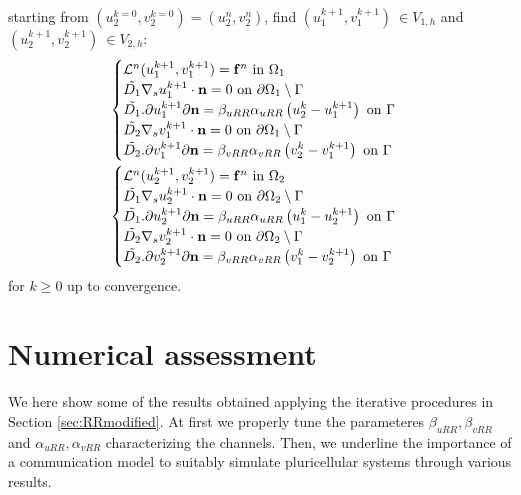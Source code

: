 starting from $(u_2^{k = 0}, v_2^{k = 0}) = (u_2^n, v_2^n)$, find $(u_1^{k+1}, v_1^{k+1}) \ \in V_{1,h}$ and $(u_2^{k+1}, v_2^{k+1}) \ \in V_{2,h}$:
\begin{equation}\label{eq::RRmodP}
\begin{aligned}
& \begin{cases}
\mathcal{L}^n (u_1^{k+1}, v_1^{k+1}) = \mathbf{f}^n \ \text{in} \ \Omega_1 \\
\Tilde{D_1} \nabla_s u_1^{k+1} \cdot \mathbf{n} = 0 \ \text{on} \ \partial \Omega_1 \setminus \Gamma \\
\Tilde{D_1} \displaystyle.{\partial u_1^{k+1}}{\partial \mathbf{n}} = \beta_{uRR} \alpha_{uRR} \left( u_2^{k} - u_1^{k+1} \right) \ \text{on} \ \Gamma \\
\Tilde{D_2} \nabla_s v_1^{k+1} \cdot \mathbf{n} = 0 \ \text{on} \ \partial \Omega_1 \setminus \Gamma \\
\Tilde{D_2} \displaystyle.{\partial v_1^{k+1}}{\partial \mathbf{n}} = \beta_{vRR} \alpha_{vRR} \left( v_2^{k} - v_1^{k+1} \right) \ \text{on} \ \Gamma
\end{cases}
\\
& \begin{cases}
\mathcal{L}^n (u_2^{k+1}, v_2^{k+1}) = \mathbf{f}^n \ \text{in} \ \Omega_2 \\
\Tilde{D_1} \nabla_s u_2^{k+1} \cdot \mathbf{n} = 0 \ \text{on} \ \partial \Omega_2 \setminus \Gamma \\
\Tilde{D_1} \displaystyle.{\partial u_2^{k+1}}{\partial \mathbf{n}} = \beta_{uRR} \alpha_{uRR} \left( u_1^{k} - u_2^{k+1} \right) \ \text{on} \ \Gamma \\
\Tilde{D_2} \nabla_s v_2^{k+1} \cdot \mathbf{n} = 0 \ \text{on} \ \partial \Omega_2 \setminus \Gamma\\
\Tilde{D_2} \displaystyle.{\partial v_2^{k+1}}{\partial \mathbf{n}} = \beta_{vRR} \alpha_{vRR} \left( v_1^{k} - v_2^{k+1} \right) \ \text{on} \ \Gamma
\end{cases}
\end{aligned}\end{equation}
 for $k \geq 0$ up to convergence.

\section{Numerical assessment}\label{cap3:results}
We here show some of the results obtained applying the iterative procedures in Section \ref{sec:RRmodified}. At first we properly tune the parameteres $\beta_{uRR}, \beta_{vRR}$ and $\alpha_{uRR}, \alpha_{vRR}$ characterizing the channels. Then, we underline the importance of a communication model to suitably simulate pluricellular systems through various results.

